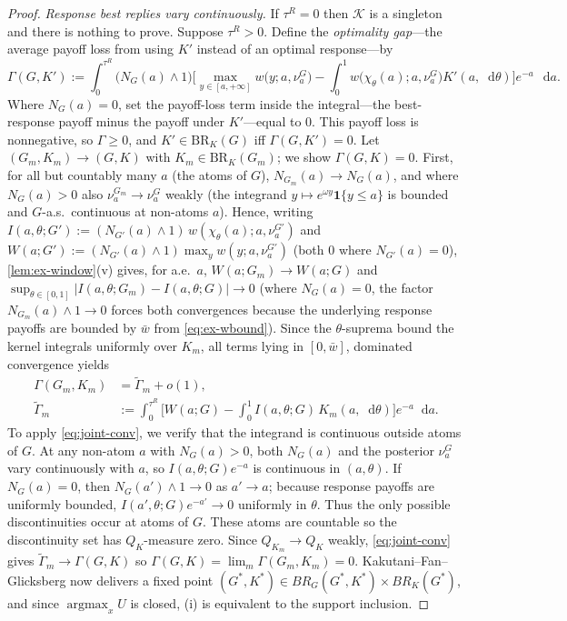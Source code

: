 \documentclass[12pt,reqno]{article}
\newcommand{\de}{\mathop{}\!\mathrm{d}}
\theoremstyle{definition} \newtheorem{example}{Example}
\theoremstyle{definition} \newtheorem{condition}{Condition}
\theoremstyle{definition} \newtheorem{corollary}{Corollary}
\theoremstyle{definition} \newtheorem{claim}{Claim}
\theoremstyle{definition} \newtheorem{definition}{Definition}
\theoremstyle{definition} \newtheorem{conjecture}{Conjecture}
\theoremstyle{definition} \newtheorem{Lemma}{Lemma}
\theoremstyle{definition} \newtheorem{lemma}{Lemma}
\theoremstyle{plain} \newtheorem{theorem}{Theorem}
\theoremstyle{definition} \newtheorem{assumption}{Assumption}
\theoremstyle{definition} \newtheorem*{assumptionnonumber}{Assumption}
\theoremstyle{definition} \newtheorem*{theoremNoNumber}{Proposition}
\theoremstyle{definition}
\theoremstyle{definition}\newtheorem{proposition}{Proposition}
\theoremstyle{definition} \newtheorem{result}{Result}
\theoremstyle{definition} \newtheorem*{definitionNoNumber}{Definition}
\theoremstyle{definition} \newtheorem{Definition}{Definition}
\theoremstyle{definition} \newtheorem*{DefinitionNoNumber}{Definition}
\theoremstyle{definition} \newtheorem*{fact}{Fact}
\theoremstyle{definition} \newtheorem*{property}{Property}
\DeclareMathOperator*{\argmax}{argmax}
\theoremstyle{definition} \newtheorem{remark}{Remark}
\begin{document}
\begin{proof}
\emph{Response best replies vary continuously.} If $\tau^R = 0$ then $\mathcal{K}$ is a singleton and there is nothing to prove. Suppose $\tau^R > 0$. Define the \emph{optimality gap}---the average payoff loss from using $K'$ instead of an optimal response---by
\[
\Gamma(G,K'):=\int_0^{\tau^R}\big(N_G(a)\wedge1\big)\Big[\max_{y\in[a,+\infty]}w\big(y;a,\nu^G_a\big)-\int_0^1 w\big(\chi_\theta(a);a,\nu^G_a\big)K'(a,\de\theta)\Big]e^{-a}\,\de a .
\]
Where $N_G(a)=0$, set the payoff-loss term inside the integral---the best-response payoff minus the payoff under $K'$---equal to $0$. This payoff loss is nonnegative, so $\Gamma\ge0$, and $K'\in\mathrm{BR}_K(G)$ iff $\Gamma(G,K')=0$. Let $(G_m,K_m)\to(G,K)$ with $K_m\in\mathrm{BR}_K(G_m)$; we show $\Gamma(G,K)=0$. First, for all but countably many $a$ (the atoms of $G$), $N_{G_m}(a)\to N_G(a)$, and where $N_G(a)>0$ also $\nu^{G_m}_a\to\nu^G_a$ weakly (the integrand $y\mapsto e^{\omega y}\mathbf 1\{y\le a\}$ is bounded and $G$-a.s.\ continuous at non-atoms $a$). Hence, writing $I(a,\theta;G'):=(N_{G'}(a)\wedge1)\,w(\chi_\theta(a);a,\nu^{G'}_a)$ and $W(a;G'):=(N_{G'}(a)\wedge1)\max_y w(y;a,\nu^{G'}_a)$ (both $0$ where $N_{G'}(a)=0$), \cref{lem:ex-window}(v) gives, for a.e.\ $a$,
$
W(a;G_m)\to W(a;G)$ and $\sup_{\theta\in[0,1]}\big|I(a,\theta;G_m)-I(a,\theta;G)\big|\to0$
(where $N_G(a)=0$, the factor $N_{G_m}(a)\wedge1\to0$ forces both convergences because the underlying response payoffs are bounded by $\bar w$ from  \eqref{eq:ex-wbound}). Since the $\theta$-suprema bound the kernel integrals uniformly over $K_m$, all terms lying in $[0,\bar w]$, dominated convergence yields
\begin{align*}
\Gamma(G_m,K_m)&=\widetilde\Gamma_m+o(1),\\
\widetilde\Gamma_m
&:=\int_0^{\tau^R}
\Big[W(a;G)-\int_0^1 I(a,\theta;G)\,K_m(a,\de\theta)\Big]e^{-a}\de a .
\end{align*}
To apply \eqref{eq:joint-conv}, we verify that the integrand is continuous outside atoms of $G$. At any non-atom $a$ with $N_G(a)>0$, both $N_G(a)$ and the posterior $\nu_a^G$ vary continuously with $a$, so $I(a,\theta;G)e^{-a}$ is continuous in $(a,\theta)$. If $N_G(a)=0$, then $N_G(a')\wedge1\to0$ as $a'\to a$; because response payoffs are uniformly bounded, $I(a',\theta;G)e^{-a'}\to0$ uniformly in $\theta$. Thus the only possible discontinuities occur at atoms of $G$. These atoms are countable so the discontinuity set has $Q_K$-measure zero. Since $Q_{K_m}\to Q_K$ weakly, \eqref{eq:joint-conv} gives
$
\widetilde\Gamma_m\longrightarrow\Gamma(G,K)$ so $\Gamma(G,K)=\lim_m\Gamma(G_m,K_m)=0$. Kakutani--Fan--Glicksberg now delivers a fixed point $(G^\ast,K^\ast) \in BR_G(G^\ast, K^\ast) \times BR_K(G^\ast)$, and since $\argmax_x U$ is closed, (i) is equivalent to the support inclusion.
\end{proof}
\end{document}
